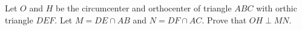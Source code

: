 Let $O$ and $H$ be the circumcenter and orthocenter of triangle $ABC$ with orthic triangle $DEF$. Let $M=DE\cap AB$ and $N=DF\cap AC$. Prove that $OH\perp MN$.
